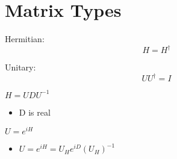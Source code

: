 \documentclass[12pt]{article}
\begin{document}

\newpage
\section{Matrix Types}

\bigskip\bigskip
Hermitian:
\boldmath $$H = H^\dagger$$ \unboldmath

Unitary:
\boldmath $$UU^\dagger = I$$ \unboldmath

\par \bigskip \bigskip
$H = UDU^{-1}$
\begin{itemize}
	\item D is real
\end{itemize}

\bigskip
$U = e^{iH}$
\begin{itemize}
	\item $U = e^{iH} = U_{H} e^{iD} (U_{H})^{-1}$
\end{itemize}
\end{document}
